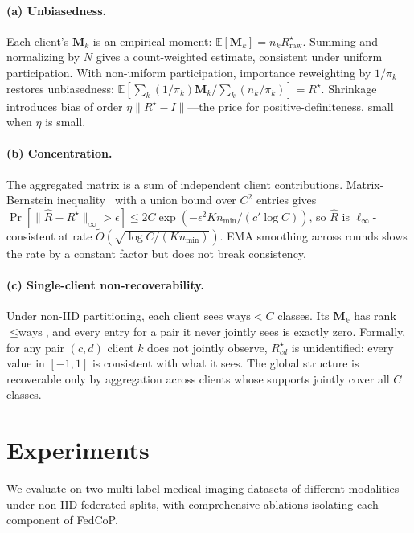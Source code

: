 \documentclass[10pt,twocolumn,letterpaper]{article}
\theoremstyle{definition}
\newcommand{\Rhat}{\widehat{R}}
\begin{document}
\paragraph{(a) Unbiasedness.} Each client's $\mathbf{M}_k$ is an empirical moment: $\mathbb{E}[\mathbf{M}_k]{=}n_k R^{\star}_{\mathrm{raw}}$. Summing and normalizing by $N$ gives a count-weighted estimate, consistent under uniform participation. With non-uniform participation, importance reweighting by $1/\pi_k$ restores unbiasedness: $\mathbb{E}[\sum_k (1/\pi_k)\mathbf{M}_k/\sum_k (n_k/\pi_k)]{=}R^{\star}$. Shrinkage introduces bias of order $\eta\|R^{\star}{-}I\|$---the price for positive-definiteness, small when $\eta$ is small.

\paragraph{(b) Concentration.} The aggregated matrix is a sum of independent client contributions. Matrix-Bernstein inequality~\cite{tropp2015matrix} with a union bound over $C^{2}$ entries gives $\Pr[\|\Rhat{-}R^{\star}\|_\infty{>}\epsilon]{\leq}2C\exp(-\epsilon^{2}K n_{\min}/(c'\log C))$, so $\Rhat$ is $\ell_\infty$-consistent at rate $\tilde O(\sqrt{\log C/(K n_{\min})})$. EMA smoothing across rounds slows the rate by a constant factor but does not break consistency.

\paragraph{(c) Single-client non-recoverability.} Under non-IID partitioning, each client sees $\text{ways}{<}C$ classes. Its $\mathbf{M}_k$ has rank $\leq\text{ways}$, and every entry for a pair it never jointly sees is exactly zero. Formally, for any pair $(c,d)$ client $k$ does not jointly observe, $R^{\star}_{cd}$ is unidentified: every value in $[-1,1]$ is consistent with what it sees. The global structure is recoverable only by aggregation across clients whose supports jointly cover all $C$ classes.

\section{Experiments}
\label{sec:experiments}

We evaluate on two multi-label medical imaging datasets of different modalities under non-IID federated splits, with comprehensive ablations isolating each component of FedCoP.
\end{document}
